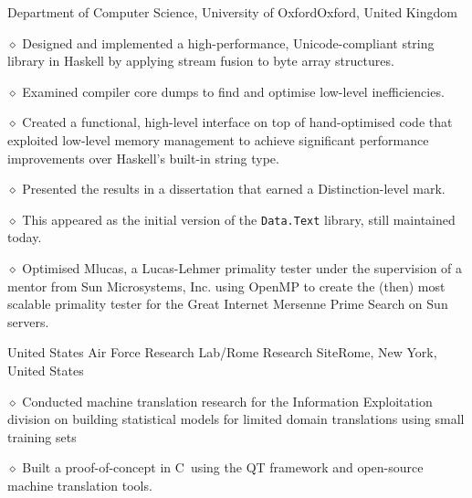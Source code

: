 \break

{Department of Computer Science, University of Oxford}{Oxford, United Kingdom}
\medskip

\parindent=20pt
\item{$\diamond$} Designed and implemented a high-performance, Unicode-compliant string library
in Haskell by applying stream fusion to byte array structures.
\item{$\diamond$} Examined compiler core dumps to find and optimise
low-level inefficiencies.
\item{$\diamond$} Created a functional, high-level interface on top of
hand-optimised code that exploited low-level memory management to achieve
significant performance improvements over Haskell's built-in string type.
\item{$\diamond$} Presented the results in a dissertation that earned a Distinction-level mark.
\item{$\diamond$} This appeared as the initial version of the {\tt Data.Text} library, still maintained today.

\bigskip

\medskip 

\parindent=20pt
\item{$\diamond$} Optimised Mlucas, a Lucas-Lehmer primality
tester under the supervision of a mentor from Sun Microsystems,
Inc. using OpenMP to create the (then) most scalable primality tester for 
the Great Internet Mersenne Prime Search on Sun servers.  
\parindent=0pt

\bigskip

{United States Air Force Research Lab/Rome Research Site}{Rome, New York, United States}
\medskip

\parindent=20pt
\item{$\diamond$} Conducted machine translation research for the
Information Exploitation division on building statistical models for limited domain 
translations using small training sets
\item{$\diamond$} Built a proof-of-concept in C\plusplus\ using the QT framework and open-source
machine translation tools.
\parindent=0pt

